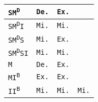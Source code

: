 \begin{tabular}{|l||c|c|c|}
 \texttt{SM\textsuperscript{D}}

 & \cellcolor{blue!40}\texttt{De.}
 & \cellcolor{orange!60}\texttt{Ex.}
 & \cellcolor{black!40}
 \\
 \hline

 \texttt{SM\textsuperscript{D}I}

 & \cellcolor{olive!80}\texttt{Mi.}
 & \cellcolor{olive!80}\texttt{Mi.}
 & \cellcolor{black!40}
 \\
 \hline

 \texttt{SM\textsuperscript{D}S}

 & \cellcolor{olive!80}\texttt{Mi.}
 & \cellcolor{orange!60}\texttt{Ex.}
 & \cellcolor{black!40}
 \\
 \hline

 \texttt{SM\textsuperscript{D}SI}

 & \cellcolor{olive!80}\texttt{Mi.}
 & \cellcolor{olive!80}\texttt{Mi.}
 & \cellcolor{black!40}
 \\
 \hline

 \texttt{M}

 & \cellcolor{blue!40}\texttt{De.}
 & \cellcolor{orange!60}\texttt{Ex.}
 & \cellcolor{black!40}
 \\
 \hline

 \texttt{MI\textsuperscript{B}}

 & \cellcolor{orange!60}\texttt{Ex.}
 & \cellcolor{orange!60}\texttt{Ex.}
 & \cellcolor{black!40}
 \\
 \hline

 \texttt{II\textsuperscript{B}}

 & \cellcolor{olive!80}\texttt{Mi.}
 & \cellcolor{olive!80}\texttt{Mi.}
 & \cellcolor{olive!80}\texttt{Mi.}
 \\
 \hline
\end{tabular}%
